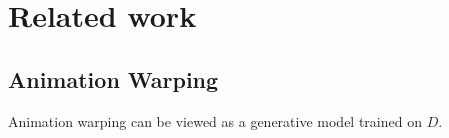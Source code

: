 \section{Related work}



\subsection{Animation Warping}
Animation warping can be viewed as a generative model trained on $D$. 

